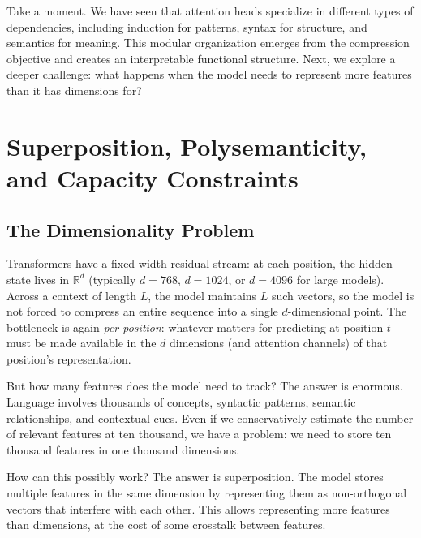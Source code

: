 \vspace{2em}

Take a moment. We have seen that attention heads specialize in different types of dependencies, including induction for patterns, syntax for structure, and semantics for meaning. This modular organization emerges from the compression objective and creates an interpretable functional structure. Next, we explore a deeper challenge: what happens when the model needs to represent more features than it has dimensions for?

\vspace{2em}

\section{Superposition, Polysemanticity, and Capacity Constraints}
\label{sec:superposition}

\vspace{1em}

\subsection{The Dimensionality Problem}

Transformers have a fixed-width residual stream: at each position, the hidden state lives in $\mathbb{R}^d$ (typically $d = 768$, $d = 1024$, or $d = 4096$ for large models). Across a context of length $L$, the model maintains $L$ such vectors, so the model is not forced to compress an entire sequence into a single $d$-dimensional point. The bottleneck is again \emph{per position}: whatever matters for predicting at position $t$ must be made available in the $d$ dimensions (and attention channels) of that position's representation.

But how many features does the model need to track? The answer is enormous. Language involves thousands of concepts, syntactic patterns, semantic relationships, and contextual cues. Even if we conservatively estimate the number of relevant features at ten thousand, we have a problem: we need to store ten thousand features in one thousand dimensions.

How can this possibly work? The answer is superposition. The model stores multiple features in the same dimension by representing them as non-orthogonal vectors that interfere with each other. This allows representing more features than dimensions, at the cost of some crosstalk between features.

